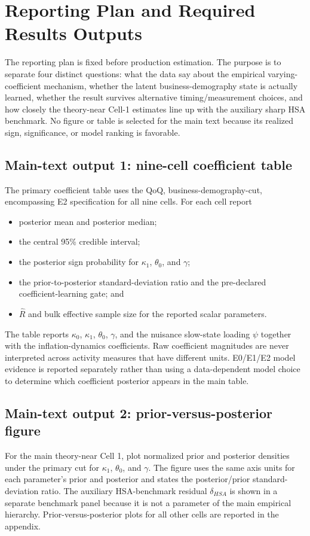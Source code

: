 \documentclass[11pt]{article}
\begin{document}
\section{Reporting Plan and Required Results Outputs}

The reporting plan is fixed before production estimation. The purpose is to separate four distinct questions: what the data say about the empirical varying-coefficient mechanism, whether the latent business-demography state is actually learned, whether the result survives alternative timing/measurement choices, and how closely the theory-near Cell-1 estimates line up with the auxiliary sharp HSA benchmark. No figure or table is selected for the main text because its realized sign, significance, or model ranking is favorable.

\subsection{Main-text output 1: nine-cell coefficient table}
The primary coefficient table uses the QoQ, business-demography-cut, encompassing E2 specification for all nine cells. For each cell report
\begin{itemize}
\item posterior mean and posterior median;
\item the central 95\% credible interval;
\item the posterior sign probability for $\kappa_1$, $\theta_0$, and $\gamma$;
\item the prior-to-posterior standard-deviation ratio and the pre-declared coefficient-learning gate; and
\item $\widehat R$ and bulk effective sample size for the reported scalar parameters.
\end{itemize}
The table reports $\kappa_0$, $\kappa_1$, $\theta_0$, $\gamma$, and the nuisance slow-state loading $\psi$ together with the inflation-dynamics coefficients. Raw coefficient magnitudes are never interpreted across activity measures that have different units. E0/E1/E2 model evidence is reported separately rather than using a data-dependent model choice to determine which coefficient posterior appears in the main table.

\subsection{Main-text output 2: prior-versus-posterior figure}
For the main theory-near Cell 1, plot normalized prior and posterior densities under the primary cut for $\kappa_1$, $\theta_0$, and $\gamma$. The figure uses the same axis units for each parameter's prior and posterior and states the posterior/prior standard-deviation ratio. The auxiliary HSA-benchmark residual $\delta_{HSA}$ is shown in a separate benchmark panel because it is not a parameter of the main empirical hierarchy. Prior-versus-posterior plots for all other cells are reported in the appendix.
\end{document}
